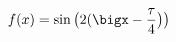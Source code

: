 \documentclass[preview]{standalone}
\begin{document}
\begin{align*}
f(x)=\sin\big(2(\bigx-\frac{\tau}{4}\big)\big)
\end{align*}
\end{document}
